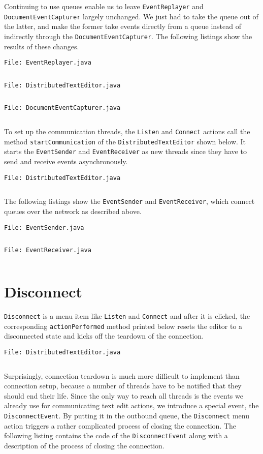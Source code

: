 \documentclass[a4paper,draft,12pt,oneside,article,table]{memoir}
\newcommand{\srcpath}{../ex09/src/main/java/ddist}
\newcommand{\inmnt}[3]{\vspace{1em}\noindent\texttt{\color{gray}File: #3}\vspace{-1em}\inputminted[tabsize=4,firstline=#1,firstnumber=#1,lastline=#2,linenos]{java}{\srcpath/#3}}
\newcommand{\mil}[1]{\texttt{#1}}
\begin{document}
Continuing to use queues enable us to leave \mil{EventReplayer} and
\mil{DocumentEventCapturer} largely unchanged. We just had to take the
queue out of the latter, and make the former take events directly from
a queue instead of indirectly through the
\mil{DocumentEventCapturer}. The following listings show the results
of these changes.

\inmnt{1}{1000}{EventReplayer.java}

\inmnt{43}{67}{DistributedTextEditor.java}

\inmnt{30}{39}{DocumentEventCapturer.java}

To set up the communication threads, the \mil{Listen} and \mil{Connect} actions
call the method \mil{startCommunication} of the
\mil{DistributedTextEditor} shown below. It starts the \mil{EventSender}
and \mil{EventReceiver} as new threads since they have to send and
receive events asynchronously.

\inmnt{300}{318}{DistributedTextEditor.java}

The following listings show the \mil{EventSender} and
\mil{EventReceiver}, which connect queues over the network as described
above.

\inmnt{1}{1000}{EventSender.java}

\inmnt{1}{1000}{EventReceiver.java}

\section{Disconnect}

\mil{Disconnect} is a menu item like \mil{Listen} and \mil{Connect} and
after it is clicked, the corresponding \mil{actionPerformed} method
printed below resets the editor to a disconnected state and kicks off
the teardown of the connection.

\inmnt{230}{240}{DistributedTextEditor.java}

Surprisingly, connection teardown is much more difficult to implement
than connection setup, because a number of threads have to be notified
that they should end their life. Since the only way to reach all threads
is the events we already use for communicating text edit actions, we
introduce a special event, the \mil{DisconnectEvent}. By putting it in
the outbound queue, the \mil{Disconnect} menu action triggers a rather
complicated process of closing the connection. The following listing
contains the code of the \mil{DisconnectEvent} along with a description
of the process of closing the connection.
\end{document}
